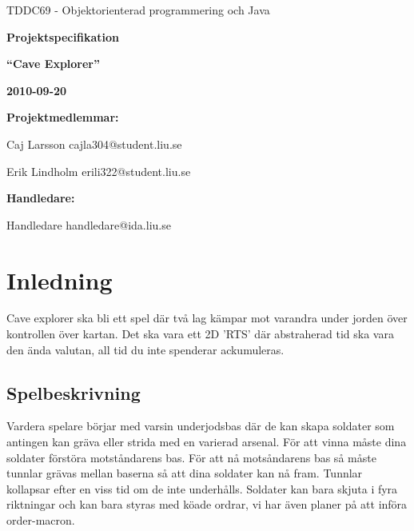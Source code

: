 \documentclass[a4paper,8pt]{article}
\begin{document}
\begin{titlepage}

TDDC69 - Objektorienterad programmering och Java
\vspace {4cm}

\begin{center}

 
\Huge{\bfseries Projektspecifikation}
\vspace {1cm}

\LARGE{\bfseries ``Cave Explorer''}
\vspace {1cm}

\LARGE{\bfseries 2010-09-20}
\vspace {1cm}

\large{ \bfseries Projektmedlemmar:}

\large{ Caj Larsson cajla304@student.liu.se}

\large{ Erik Lindholm erili322@student.liu.se}
\vspace {1cm}

\large{ \bfseries Handledare:}

\large{ Handledare handledare@ida.liu.se}
\end{center}
\end{titlepage}

\tableofcontents
\pagebreak

\section{Inledning}
Cave explorer ska bli ett spel där två lag kämpar mot varandra under jorden över
kontrollen över kartan. Det ska vara ett 2D 'RTS' där abstraherad tid ska vara
den ända valutan, all tid du inte spenderar ackumuleras.

\subsection{Spelbeskrivning}
Vardera spelare börjar med varsin underjodsbas där de kan skapa soldater som
antingen kan gräva eller strida med en varierad arsenal. För att vinna måste
dina soldater förstöra motståndarens bas. För att nå motsåndarens bas så
måste tunnlar grävas mellan baserna så att dina soldater kan nå fram.
Tunnlar kollapsar efter en viss tid om de inte underhålls. Soldater kan bara
skjuta i fyra riktningar och kan bara styras med köade ordrar, vi har även
planer på att införa order-macron.
\end{document}

